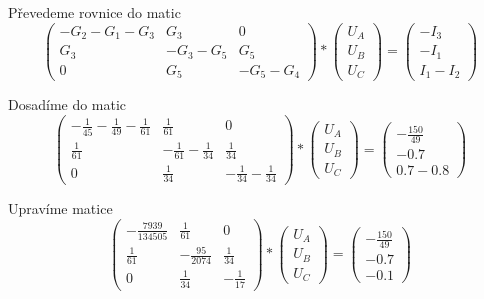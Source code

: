Převedeme rovnice do matic
\begin{equation*}
    \begin{pmatrix}
        -G_2 - G_1 - G_3 & G_3 & 0 \\
        G_3 & -G_3 - G_5 & G_5 \\
        0 & G_5 & -G_5 - G_4
    \end{pmatrix}
    *
    \begin{pmatrix}
        U_A \\
        U_B \\
        U_C
    \end{pmatrix}
    =
    \begin{pmatrix}
        -I_3 \\
        -I_1 \\
        I_1 - I_2
    \end{pmatrix}
\end{equation*}

Dosadíme do matic
\begin{equation*}
    \begin{pmatrix}
        -\frac {1} {45} -\frac {1} {49} - \frac {1} {61} & \frac {1} {61} & 0 \\[6pt]
        \frac {1} {61} & -\frac {1} {61} - \frac {1} {34} & \frac {1} {34} \\[6pt]
        0 & \frac {1} {34} & -\frac {1} {34} - \frac {1} {34}
    \end{pmatrix}
    *
    \begin{pmatrix}
    U_A \\[6pt]
    U_B \\[6pt]
    U_C
    \end{pmatrix}
    =
    \begin{pmatrix}
    -\frac {150} {49} \\[6pt]
    -0.7 \\[6pt]
    0.7 - 0.8
    \end{pmatrix}
\end{equation*}

Upravíme matice
\begin{equation*}
    \begin{pmatrix}
        -\frac {7939} {134505} & \frac {1} {61} & 0 \\[6pt]
        \frac {1} {61} & -\frac {95} {2074} & \frac {1} {34} \\[6pt]
        0 & \frac {1} {34} & -\frac {1} {17}
    \end{pmatrix}
    *
    \begin{pmatrix}
    U_A \\[6pt]
    U_B \\[6pt]
    U_C
    \end{pmatrix}
    =
    \begin{pmatrix}
    -\frac {150} {49} \\[6pt]
    -0.7 \\[6pt]
    -0.1
    \end{pmatrix}
\end{equation*}


